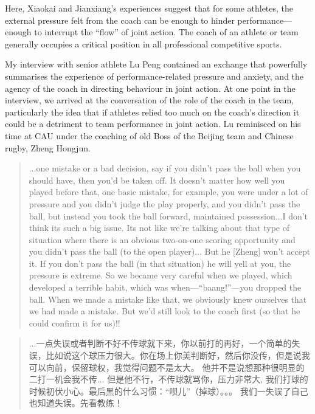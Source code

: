 \begin{CJK}{UTF8}{gbsn}
Here, Xiaokai and Jianxiang's experiences suggest that for some athletes, the external pressure felt from the coach can be enough to hinder performance---enough to interrupt the ``flow'' of joint action.   The coach of an athlete or team generally occupies a critical position in all professional competitive sports.


My interview with senior athlete Lu Peng contained an exchange that powerfully summarises the experience of performance-related pressure and anxiety, and the agency of the coach in directing behaviour in joint action.  At one point in the interview, we arrived at the conversation of the role of the coach in the team, particularly the idea that if athletes relied too much on the coach's direction it could be a detriment to team performance in joint action.  Lu reminisced on his time at CAU under the coaching of old Boss of the Beijing team and Chinese rugby, Zheng Hongjun.

    \begin{quote}
      ...one mistake or a bad decision, say if you didn't pass the ball when you should have, then you'd be taken off.  It doesn't matter how well you played before that, one basic mistake, for example, you were under a lot of pressure and you didn't judge the play properly, and you didn't pass the ball, but instead you took the ball forward, maintained possession...I don't think its such a big issue.
      Its not like we're talking about that type of situation where there is an obvious two-on-one scoring opportunity and you didn't pass the ball (to the open player)...
      But he [Zheng] won't accept it.  If you don't pass the ball (in that situation) he will yell at you, the pressure is extreme.  So we became very careful when we played, which developed a terrible habit, which was when---``baang!''---you dropped the ball. When we made a mistake like that, we obviously knew ourselves that we had made a mistake.  But we'd still look to the coach first (so that he could confirm it for us)!!
    \end{quote}

    \begin{quote}
      ...一点失误或者判断不好不传球就下来，你以前打的再好，一个简单的失误，比如说这个球压力很大。你在场上你美判断好，然后你没传，但是说我可以向前，保留球权，我觉得问题不是太大。
      他并不是说想那种很明显的二打一机会我不传...
      但是他不行，不传球就骂你，压力非常大, 我们打球的时候初伏小心。最后黑的什么习惯：“呗儿”（掉球）。。。 我们一失误了自己也知道失误。先看教练！
    \end{quote}


\end{CJK}
